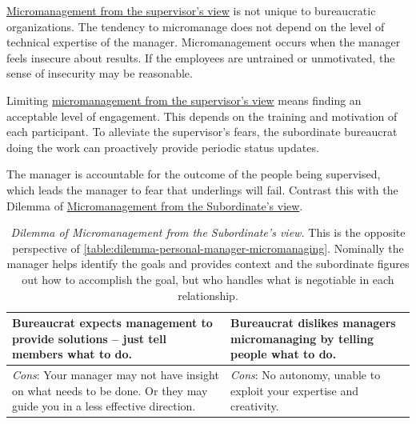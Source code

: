 \hyperref[table:dilemma-personal-manager-micromanaging]{Micromanagement from the supervisor's view} is not unique to bureaucratic organizations. The tendency to micromanage does not depend on the level of technical expertise of the manager. Micromanagement occurs when the manager feels insecure about results. If the employees are untrained or unmotivated, the sense of insecurity may be reasonable.

Limiting \hyperref[table:dilemma-personal-manager-micromanaging]{micromanagement from the supervisor's view} means finding an acceptable level of engagement. This depends on the training and motivation of each participant. To alleviate the supervisor's fears, the subordinate bureaucrat doing the work can proactively provide periodic status updates. 

The manager is accountable for the outcome of the people being supervised, which leads the manager to fear that underlings will fail.  Contrast this with the Dilemma of  \hyperref[table:dilemma-personal-solution-provider]{Micromanagement from the Subordinate’s view}.

\begin{center}
\begin{table}[H] %
\begin{tabular}{ | m{\dilemmatablewidth}| m{\dilemmatablewidth} | } 
  \hline
  \textbf{Bureaucrat expects management to provide solutions -- just tell members what to do.} & 
  \textbf{Bureaucrat dislikes managers micromanaging by telling people what to do.} \\ 
  \hline
  \textit{Cons}: Your manager may not have insight on what needs to be done. Or they may guide you in a less effective direction. &
  \textit{Cons}: No autonomy, unable to exploit your expertise and creativity. \\  
  \hline
\end{tabular}
\caption{\textit{Dilemma of Micromanagement from the Subordinate's view.}
This is the opposite perspective of \ref{table:dilemma-personal-manager-micromanaging}. Nominally the manager helps identify the goals and provides context and the subordinate figures out how to accomplish the goal, but who handles what is negotiable in each relationship.
}
\label{table:dilemma-personal-solution-provider}
\end{table}
\end{center}

